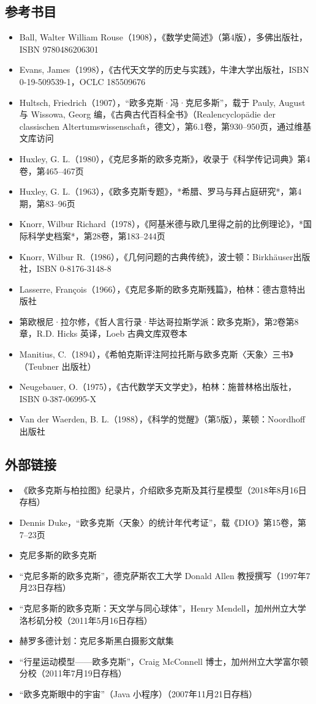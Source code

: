 \subsection{参考书目}
\begin{itemize}
\item Ball, Walter William Rouse（1908），《数学史简述》（第4版），多佛出版社，ISBN 9780486206301
\item Evans, James（1998），《古代天文学的历史与实践》，牛津大学出版社，ISBN 0-19-509539-1，OCLC 185509676
\item Hultsch, Friedrich（1907），“欧多克斯·冯·克尼多斯”，载于 Pauly, August 与 Wissowa, Georg 编，《古典古代百科全书》（Realencyclopädie der classischen Altertumswissenschaft，德文），第6.1卷，第930–950页，通过维基文库访问
\item Huxley, G. L.（1980），《克尼多斯的欧多克斯》，收录于《科学传记词典》第4卷，第465–467页
\item Huxley, G. L.（1963），《欧多克斯专题》，*希腊、罗马与拜占庭研究*，第4期，第83–96页
\item Knorr, Wilbur Richard（1978），《阿基米德与欧几里得之前的比例理论》，*国际科学史档案*，第28卷，第183–244页
\item Knorr, Wilbur R.（1986），《几何问题的古典传统》，波士顿：Birkhäuser出版社，ISBN 0-8176-3148-8
\item Lasserre, François（1966），《克尼多斯的欧多克斯残篇》，柏林：德古意特出版社
\item 第欧根尼·拉尔修，《哲人言行录·毕达哥拉斯学派：欧多克斯》，第2卷第8章，R.D. Hicks 英译，Loeb 古典文库双卷本
\item Manitius, C.（1894），《希帕克斯评注阿拉托斯与欧多克斯〈天象〉三书》（Teubner 出版社）
\item Neugebauer, O.（1975），《古代数学天文学史》，柏林：施普林格出版社，ISBN 0-387-06995-X
\item Van der Waerden, B. L.（1988），《科学的觉醒》（第5版），莱顿：Noordhoff 出版社
\end{itemize}
\subsection{外部链接}
\begin{itemize}
\item 《欧多克斯与柏拉图》纪录片，介绍欧多克斯及其行星模型（2018年8月16日存档）
\item Dennis Duke，“欧多克斯〈天象〉的统计年代考证”，载《DIO》第15卷，第7–23页
\item 克尼多斯的欧多克斯
\item “克尼多斯的欧多克斯”，德克萨斯农工大学 Donald Allen 教授撰写（1997年7月23日存档）
\item “克尼多斯的欧多克斯：天文学与同心球体”，Henry Mendell，加州州立大学洛杉矶分校（2011年5月16日存档）
\item 赫罗多德计划：克尼多斯黑白摄影文献集
\item “行星运动模型——欧多克斯”，Craig McConnell 博士，加州州立大学富尔顿分校（2011年7月19日存档）
\item “欧多克斯眼中的宇宙”（Java 小程序）（2007年11月21日存档）
\end{itemize}